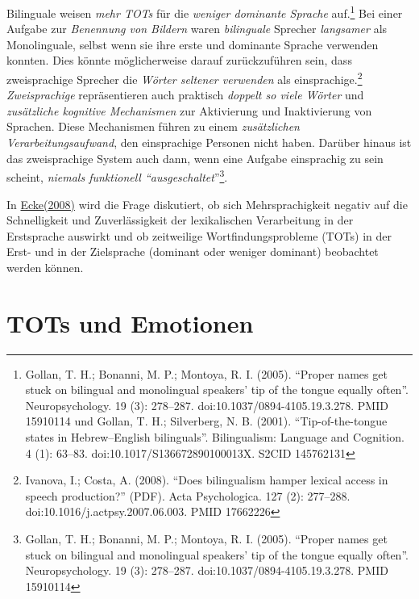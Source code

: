 \documentclass[
  letterpaper,
]{scrbook}
\begin{document}
Bilinguale weisen \emph{mehr TOTs} für die \emph{weniger dominante
Sprache} auf.\footnote{Gollan, T. H.; Bonanni, M. P.; Montoya, R. I.
  (2005). ``Proper names get stuck on bilingual and monolingual
  speakers' tip of the tongue equally often''. Neuropsychology. 19 (3):
  278--287. doi:10.1037/0894-4105.19.3.278. PMID 15910114 und Gollan, T.
  H.; Silverberg, N. B. (2001). ``Tip-of-the-tongue states in
  Hebrew--English bilinguals''. Bilingualism: Language and Cognition. 4
  (1): 63--83. doi:10.1017/S136672890100013X. S2CID 145762131} Bei einer
Aufgabe zur \emph{Benennung von Bildern} waren \emph{bilinguale}
Sprecher \emph{langsamer} als Monolinguale, selbst wenn sie ihre erste
und dominante Sprache verwenden konnten. Dies könnte möglicherweise
darauf zurückzuführen sein, dass zweisprachige Sprecher die \emph{Wörter
seltener verwenden} als einsprachige.\footnote{Ivanova, I.; Costa, A.
  (2008). ``Does bilingualism hamper lexical access in speech
  production?'' (PDF). Acta Psychologica. 127 (2): 277--288.
  doi:10.1016/j.actpsy.2007.06.003. PMID 17662226} \emph{Zweisprachige}
repräsentieren auch praktisch \emph{doppelt so viele Wörter} und
\emph{zusätzliche kognitive Mechanismen} zur Aktivierung und
Inaktivierung von Sprachen. Diese Mechanismen führen zu einem
\emph{zusätzlichen Verarbeitungsaufwand}, den einsprachige Personen
nicht haben. Darüber hinaus ist das zweisprachige System auch dann, wenn
eine Aufgabe einsprachig zu sein scheint, \emph{niemals funktionell
``ausgeschaltet}''\footnote{Gollan, T. H.; Bonanni, M. P.; Montoya, R.
  I. (2005). ``Proper names get stuck on bilingual and monolingual
  speakers' tip of the tongue equally often''. Neuropsychology. 19 (3):
  278--287. doi:10.1037/0894-4105.19.3.278. PMID 15910114}.

In
\href{http://babylonia.ch/de/archiv/2008/nummer-2-08/die-kosten-der-mehrsprachigkeit-zeit-und-fehler-bei-der-wortfindung/}{Ecke(2008)}
wird die Frage diskutiert, ob sich Mehrsprachigkeit negativ auf die
Schnelligkeit und Zuverlässigkeit der lexikalischen Verarbeitung in der
Erstsprache auswirkt und ob zeitweilige Wortfindungsprobleme (TOTs) in
der Erst- und in der Zielsprache (dominant oder weniger dominant)
beobachtet werden können.

\hypertarget{tots-und-emotionen}{%
\section{TOTs und Emotionen}\label{tots-und-emotionen}}
\end{document}
